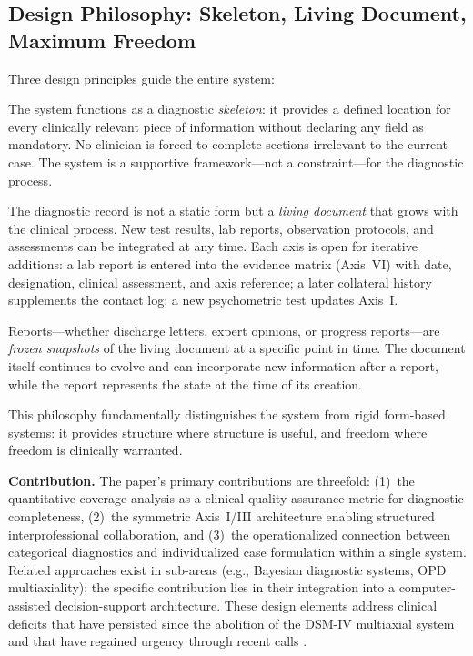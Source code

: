 \documentclass[11pt,a4paper]{article}
\begin{document}
\subsection{Design Philosophy: Skeleton, Living Document, Maximum Freedom}
\label{sec:designphilosophy}

Three design principles guide the entire system:

\begin{description}[style=nextline, leftmargin=1.5cm, font=\bfseries]
\item[Skeleton Principle] The system functions as a diagnostic \textit{skeleton}: it provides a defined location for every clinically relevant piece of information without declaring any field as mandatory. No clinician is forced to complete sections irrelevant to the current case. The system is a supportive framework---not a constraint---for the diagnostic process.
\item[Living Document] The diagnostic record is not a static form but a \textit{living document} that grows with the clinical process. New test results, lab reports, observation protocols, and assessments can be integrated at any time. Each axis is open for iterative additions: a lab report is entered into the evidence matrix (Axis~VI) with date, designation, clinical assessment, and axis reference; a later collateral history supplements the contact log; a new psychometric test updates Axis~I.
\item[Report as Snapshot] Reports---whether discharge letters, expert opinions, or progress reports---are \textit{frozen snapshots} of the living document at a specific point in time. The document itself continues to evolve and can incorporate new information after a report, while the report represents the state at the time of its creation.
\end{description}

This philosophy fundamentally distinguishes the system from rigid form-based systems: it provides structure where structure is useful, and freedom where freedom is clinically warranted.

\textbf{Contribution.} The paper's primary contributions are threefold: (1)~the quantitative coverage analysis as a clinical quality assurance metric for diagnostic completeness, (2)~the symmetric Axis~I/III architecture enabling structured interprofessional collaboration, and (3)~the operationalized connection between categorical diagnostics and individualized case formulation within a single system. Related approaches exist in sub-areas (e.g., Bayesian diagnostic systems, OPD multiaxiality); the specific contribution lies in their integration into a computer-assisted decision-support architecture. These design elements address clinical deficits that have persisted since the abolition of the DSM-IV multiaxial system and that have regained urgency through recent calls \citep{ErlichFirst2025}.
\end{document}
